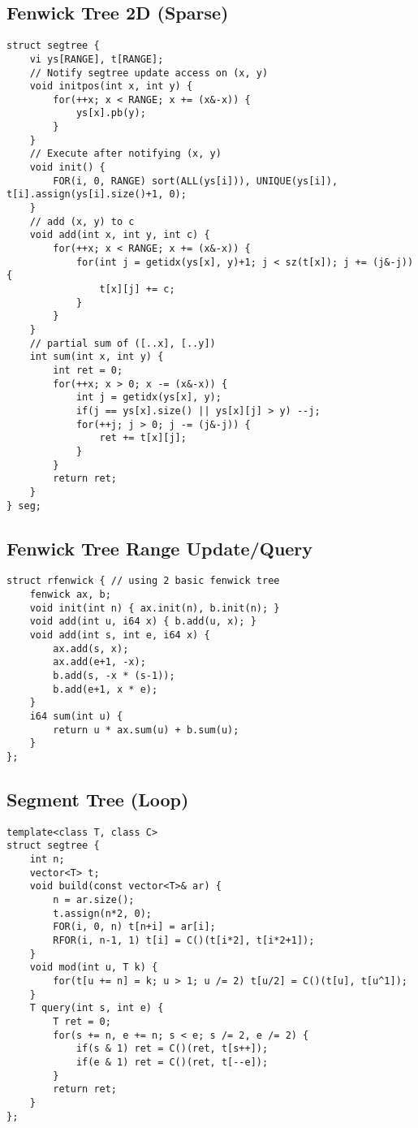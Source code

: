 \documentclass[landscape, 8pt, a4paper, oneside, twocolumn]{extarticle}
\begin{document}
\subsection {Fenwick Tree 2D (Sparse)}
\begin{verbatim}
struct segtree {
	vi ys[RANGE], t[RANGE];
	// Notify segtree update access on (x, y)
	void initpos(int x, int y) {
		for(++x; x < RANGE; x += (x&-x)) {
			ys[x].pb(y);
		}
	}
	// Execute after notifying (x, y)
	void init() {
		FOR(i, 0, RANGE) sort(ALL(ys[i])), UNIQUE(ys[i]), t[i].assign(ys[i].size()+1, 0);
	}
	// add (x, y) to c
	void add(int x, int y, int c) {
		for(++x; x < RANGE; x += (x&-x)) {
			for(int j = getidx(ys[x], y)+1; j < sz(t[x]); j += (j&-j)) {
				t[x][j] += c;
			}
		}
	}
	// partial sum of ([..x], [..y])
	int sum(int x, int y) {
		int ret = 0;
		for(++x; x > 0; x -= (x&-x)) {
			int j = getidx(ys[x], y);
			if(j == ys[x].size() || ys[x][j] > y) --j;
			for(++j; j > 0; j -= (j&-j)) {
				ret += t[x][j];
			}
		}
		return ret;
	}
} seg;

\end{verbatim}
\subsection {Fenwick Tree Range Update/Query}
\begin{verbatim}
struct rfenwick { // using 2 basic fenwick tree
	fenwick ax, b;
	void init(int n) { ax.init(n), b.init(n); }
	void add(int u, i64 x) { b.add(u, x); }
	void add(int s, int e, i64 x) {
		ax.add(s, x);
		ax.add(e+1, -x);
		b.add(s, -x * (s-1));
		b.add(e+1, x * e);
	}
	i64 sum(int u) {
		return u * ax.sum(u) + b.sum(u);
	}
};
\end{verbatim}
\subsection {Segment Tree (Loop)}
\begin{verbatim}
template<class T, class C>
struct segtree {
	int n;
	vector<T> t;
	void build(const vector<T>& ar) {
		n = ar.size();
		t.assign(n*2, 0);
		FOR(i, 0, n) t[n+i] = ar[i];
		RFOR(i, n-1, 1) t[i] = C()(t[i*2], t[i*2+1]);
	}
	void mod(int u, T k) {
		for(t[u += n] = k; u > 1; u /= 2) t[u/2] = C()(t[u], t[u^1]);
	}
	T query(int s, int e) {
		T ret = 0;
		for(s += n, e += n; s < e; s /= 2, e /= 2) {
			if(s & 1) ret = C()(ret, t[s++]);
			if(e & 1) ret = C()(ret, t[--e]);
		}
		return ret;
	}
};
\end{verbatim}
\end{document}
